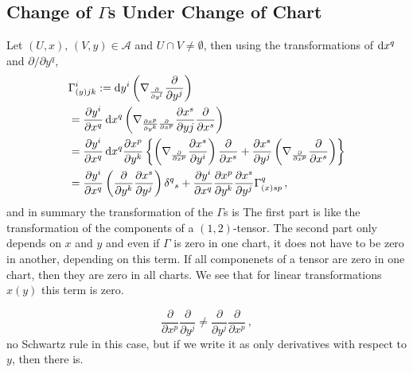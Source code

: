 \documentclass[11pt, a4paper, twocolumn]{article} %
\begin{document}
\subsection[Change of Gammas Under Change of Chart]{Change of $\Gamma$s Under Change of Chart}
Let $(U,x),\,(V,y)\in\mathcal{A}$ and $U\cap V \neq \emptyset$, then using the transformations of $\operatorname{d\!} x^q$ and
$\partial/\partial y^q$,
\begin{align*}
    &\Gamma^i_{(y)jk} := \operatorname{d\!} y^i \left( \nabla_{\frac{\partial}{\partial y^l}} \frac{\partial}{\partial y^j} \right) \\
    &= \frac{\partial y^i}{\partial x^q}\operatorname{d\!} x^q \left( \nabla_{\frac{\partial x^p}{\partial y^k}\frac{\partial}{\partial x^p}}
    \frac{\partial x^s}{\partial yj}\frac{\partial}{\partial x^s}\right)\\
    &= \frac{\partial y^i}{\partial x^q}\operatorname{d\!} x^q \frac{\partial x^p}{\partial y^k} 
    \left\{ \left( \nabla_{\frac{\partial}{\partial x^p}} \frac{\partial x^s}{\partial y^i} \right) \frac{\partial}{\partial x^s}
        + \frac{\partial x^s}{\partial y^j} \left( \nabla_{\frac{\partial}{\partial x^p}}\frac{\partial}{\partial x^s} \right)
    \right\}\\
    &= \frac{\partial y^i}{\partial x^q} \left(\frac{\partial}{\partial y^k} \frac{\partial x^s}{\partial y^j} \right) \delta^q{}_s
    + \frac{\partial y^i}{\partial x^q} \frac{\partial x^p}{\partial y^k} \frac{\partial x^s}{\partial y^j} \Gamma^q_{(x)sp}\,,
\end{align*}
and in summary the transformation of the $\Gamma$s is
The first part is like the transformation of the components of a $(1,2)$-tensor.
The second part only depends on $x$ and $y$ and even if $\Gamma$ is zero in one chart, it does not have to be zero
in another, depending on this term.
If all componenets of a tensor are zero in one chart, then they are zero in all charts.
We see that for linear transformations $x(y)$ this term is zero.
\begin{note}
    \begin{equation}
        \frac{\partial}{\partial x^p}\frac{\partial}{\partial y^j} \neq \frac{\partial}{\partial y^j}\frac{\partial}{\partial x^p} \,,
    \end{equation}
    no Schwartz rule in this case, but if we write it as only derivatives with respect to $y$, then there is.
\end{note}
\end{document}

